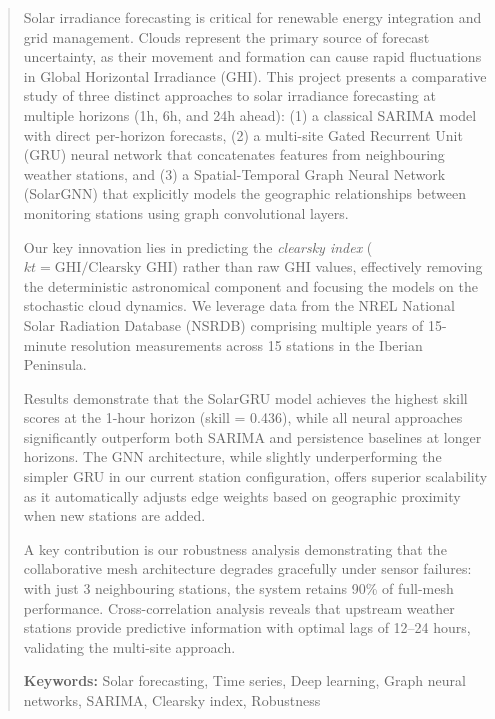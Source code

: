 \documentclass[11pt,a4paper]{article}
\begin{document}
\newpage
\begin{abstract}
Solar irradiance forecasting is critical for renewable energy integration and grid management. Clouds represent the primary source of forecast uncertainty, as their movement and formation can cause rapid fluctuations in Global Horizontal Irradiance (GHI). This project presents a comparative study of three distinct approaches to solar irradiance forecasting at multiple horizons (1h, 6h, and 24h ahead): (1) a classical SARIMA model with direct per-horizon forecasts, (2) a multi-site Gated Recurrent Unit (GRU) neural network that concatenates features from neighbouring weather stations, and (3) a Spatial-Temporal Graph Neural Network (SolarGNN) that explicitly models the geographic relationships between monitoring stations using graph convolutional layers.

Our key innovation lies in predicting the \textit{clearsky index} ($kt = \text{GHI} / \text{Clearsky GHI}$) rather than raw GHI values, effectively removing the deterministic astronomical component and focusing the models on the stochastic cloud dynamics. We leverage data from the NREL National Solar Radiation Database (NSRDB) comprising multiple years of 15-minute resolution measurements across 15 stations in the Iberian Peninsula.

Results demonstrate that the SolarGRU model achieves the highest skill scores at the 1-hour horizon (skill = 0.436), while all neural approaches significantly outperform both SARIMA and persistence baselines at longer horizons. The GNN architecture, while slightly underperforming the simpler GRU in our current station configuration, offers superior scalability as it automatically adjusts edge weights based on geographic proximity when new stations are added.

A key contribution is our robustness analysis demonstrating that the collaborative mesh architecture degrades gracefully under sensor failures: with just 3 neighbouring stations, the system retains 90\% of full-mesh performance. Cross-correlation analysis reveals that upstream weather stations provide predictive information with optimal lags of 12--24 hours, validating the multi-site approach.

\noindent\textbf{Keywords:} Solar forecasting, Time series, Deep learning, Graph neural networks, SARIMA, Clearsky index, Robustness
\end{abstract}
\end{document}
